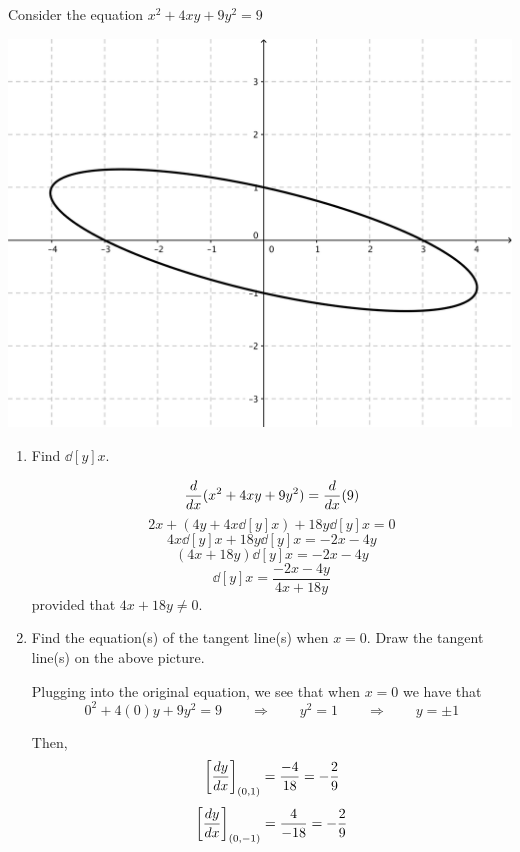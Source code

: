 \documentclass[nooutcomes]{ximera}
\begin{document}
\begin{problem}
Consider the equation $x^2 + 4xy + 9y^2 = 9$

\begin{image}
\includegraphics[scale=.6]{figure1.png}
\end{image}

	\begin{enumerate}
	
	\item  Find $\dd[y]{x}$.
		\begin{freeResponse}
		$$ \ddx(x^2 + 4xy + 9y^2) = \ddx(9) $$
		$$ 2x + \left(4y + 4x \dd[y]{x} \right) + 18 y \dd[y]{x} = 0 $$
		$$ 4x \dd[y]{x} + 18y \dd[y]{x} = -2x - 4y $$
		$$ (4x+18y) \dd[y]{x} = -2x-4y $$
		$$ \dd[y]{x} = \frac{-2x-4y}{4x+18y} $$
		provided that $4x+18y \neq 0$.
		\end{freeResponse}
		
		
		
	\item  Find the equation(s) of the tangent line(s) when $x=0$.  Draw the tangent line(s) on the above picture.
		\begin{freeResponse}
		Plugging into the original equation, we see that when $x=0$ we have that 
		$$ 0^2 + 4(0)y + 9y^2 = 9 \qquad \Longrightarrow \qquad y^2 = 1 \qquad \Longrightarrow \qquad y = \pm 1 $$
		
		Then,
		$$\eval{\dd[y]{x}}_{(0,1)} = \frac{-4}{18} = -\frac{2}{9}$$
		$$\eval{\dd[y]{x}}_{(0,-1)} = \frac{4}{-18} = -\frac{2}{9} $$
		

\end{freeResponse}
\end{enumerate}
\end{problem}
\end{document}
